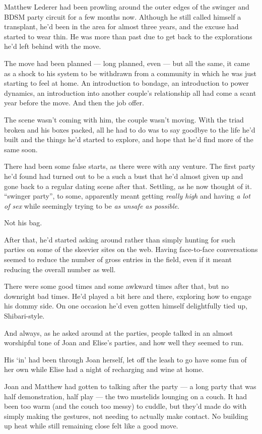 Matthew Lederer had been prowling around the outer edges of the swinger and BDSM party circuit for a few months now. Although he still called himself a transplant, he'd been in the area for almost three years, and the excuse had started to wear thin. He was more than past due to get back to the explorations he'd left behind with the move.

The move had been planned --- long planned, even --- but all the same, it came as a shock to his system to be withdrawn from a community in which he was just starting to feel at home. An introduction to bondage, an introduction to power dynamics, an introduction into another couple's relationship all had come a scant year before the move. And then the job offer.

The scene wasn't coming with him, the couple wasn't moving. With the triad broken and his boxes packed, all he had to do was to say goodbye to the life he'd built and the things he'd started to explore, and hope that he'd find more of the same soon.

There had been some false starts, as there were with any venture. The first party he'd found had turned out to be a such a bust that he'd almost given up and gone back to a regular dating scene after that. Settling, as he now thought of it. ``swinger party'', to some, apparently meant getting \emph{really high} and having \emph{a lot of sex} while seemingly trying to be \emph{as unsafe as possible}.

Not his bag.

After that, he'd started asking around rather than simply hunting for such parties on some of the skeevier sites on the web. Having face-to-face conversations seemed to reduce the number of gross entries in the field, even if it meant reducing the overall number as well.

There were some good times and some awkward times after that, but no downright bad times. He'd played a bit here and there, exploring how to engage his dommy side. On one occasion he'd even gotten himself delightfully tied up, Shibari-style.

And always, as he asked around at the parties, people talked in an almost worshipful tone of Joan and Elise's parties, and how well they seemed to run.

His `in' had been through Joan herself, let off the leash to go have some fun of her own while Elise had a night of recharging and wine at home.

Joan and Matthew had gotten to talking after the party --- a long party that was half demonstration, half play --- the two mustelids lounging on a couch. It had been too warm (and the couch too messy) to cuddle, but they'd made do with simply making the gestures, not needing to actually make contact. No building up heat while still remaining close felt like a good move.

